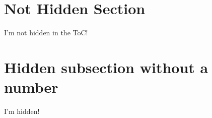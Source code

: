 
\section{Not Hidden Section}
I'm not hidden in the ToC! \cite{Albrecht2010}

\section*{Hidden subsection without a number}
I'm hidden!\cite{Albrecht2010_IEICE}

